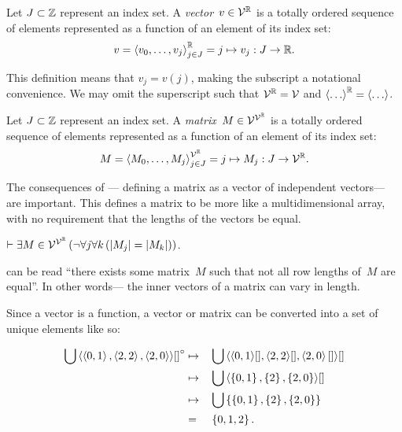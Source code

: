 \begin{definition}[Vector]
  Let $J\subset\mathbb{Z}$ represent an index set.
  A \emph{vector}~$v\in\mathcal{V}^{\mathbb{R}}$ is a totally ordered sequence of
   elements represented as a function of an element of its index set:
  \begin{equation}\label{vec}
    v = \left\langle v_0,\ldots,v_j\right\rangle^{\mathbb{R}}_{j\in J}
      = j \mapsto v_j : J \rightarrow \mathbb{R}.
  \end{equation}
\end{definition}

This definition means that $v_j = v(j)$,
  making the subscript a notational convenience.
We may omit the superscript such that $\mathcal{V}^{\mathbb{R}}=\mathcal{V}$
  and $\left\langle\ldots\right\rangle^{\mathbb{R}}=\left\langle\ldots\right\rangle$.

\begin{definition}[Matrix]
  Let $J\subset\mathbb{Z}$ represent an index set.
  A \emph{matrix}~$M\in\mathcal{V}^{\mathcal{V}^{\mathbb{R}}}$ is a totally ordered sequence of
   elements represented as a function of an element of its index set:
  \begin{equation}
    M = \left\langle M_0,\ldots,M_j\right\rangle^{\mathcal{V}^{\mathbb{R}}}_{j\in J}
      = j \mapsto M_j : J \rightarrow \mathcal{V}^{\mathbb{R}}.
  \end{equation}
\end{definition}

The consequences of ---%
  defining a matrix as a vector of independent vectors---%
  are important.
This defines a matrix to be more like a multidimensional array,
  with no requirement that the lengths of the vectors be equal.

\begin{corollary}
  $\infer \Exists{M\in\Matrices}{\neg\Forall*{j}{\Forall{k}{\len{M_j} = \len{M_k}}}}$.
\end{corollary}

 can be read ``there exists some matrix~$M$ such that
  not all row lengths of~$M$ are equal''.
In other words---%
  the inner vectors of a matrix can vary in length.

Since a vector is a function,
  a vector or matrix can be converted into a set of unique elements like so:

\begin{alignat*}{2}
  \bigcup\left\langle\left\langle0,1\right\rangle,\left\langle2,2\right\rangle,\left\langle2,0\right\rangle\right\rangle\!{[]}^\circ
    &\mapsto &&\bigcup\left\langle\left\langle0,1\right\rangle\![],\left\langle2,2\right\rangle\![],\left\langle2,0\right\rangle[]\right\rangle\![] \\
    &\mapsto &&\bigcup\left\langle\left\{0,1\right\},\left\{2\right\},\left\{2,0\right\}\right\rangle\![] \\
    &\mapsto &&\bigcup\left\{\left\{0,1\right\},\left\{2\right\},\left\{2,0\right\}\right\} \\
    &=       &&\left\{0,1,2\right\}.
\end{alignat*}

